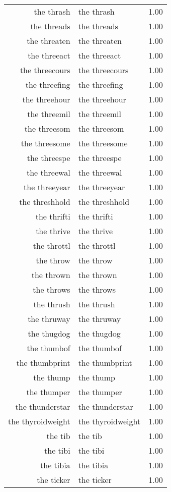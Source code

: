 \begin{table}[ht]
\begin{tabular}{rlr}
  the thrash & the thrash & 1.00 \\ 
  the threads & the threads & 1.00 \\ 
  the threaten & the threaten & 1.00 \\ 
  the threeact & the threeact & 1.00 \\ 
  the threecours & the threecours & 1.00 \\ 
  the threefing & the threefing & 1.00 \\ 
  the threehour & the threehour & 1.00 \\ 
  the threemil & the threemil & 1.00 \\ 
  the threesom & the threesom & 1.00 \\ 
  the threesome & the threesome & 1.00 \\ 
  the threespe & the threespe & 1.00 \\ 
  the threewal & the threewal & 1.00 \\ 
  the threeyear & the threeyear & 1.00 \\ 
  the threshhold & the threshhold & 1.00 \\ 
  the thrifti & the thrifti & 1.00 \\ 
  the thrive & the thrive & 1.00 \\ 
  the throttl & the throttl & 1.00 \\ 
  the throw & the throw & 1.00 \\ 
  the thrown & the thrown & 1.00 \\ 
  the throws & the throws & 1.00 \\ 
  the thrush & the thrush & 1.00 \\ 
  the thruway & the thruway & 1.00 \\ 
  the thugdog & the thugdog & 1.00 \\ 
  the thumbof & the thumbof & 1.00 \\ 
  the thumbprint & the thumbprint & 1.00 \\ 
  the thump & the thump & 1.00 \\ 
  the thumper & the thumper & 1.00 \\ 
  the thunderstar & the thunderstar & 1.00 \\ 
  the thyroidweight & the thyroidweight & 1.00 \\ 
  the tib & the tib & 1.00 \\ 
  the tibi & the tibi & 1.00 \\ 
  the tibia & the tibia & 1.00 \\ 
  the ticker & the ticker & 1.00 \\ 

\end{tabular}
\end{table}
